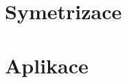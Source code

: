 \documentclass{article}
\begin{document}
\newpage



\section{Symetrizace}

\newpage



\section{Aplikace}
\end{document}
